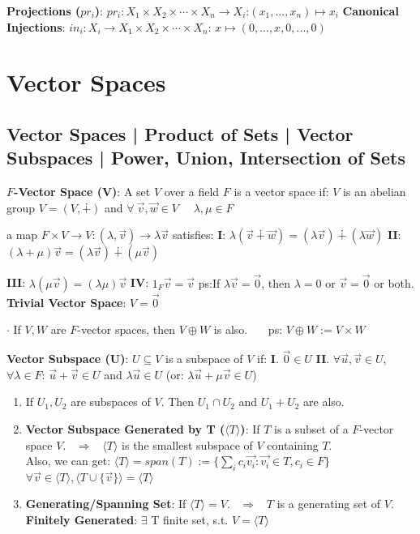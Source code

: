\documentclass[9pt]{article}
\begin{document}
\textbf{Projections ($pr_i$)}: {\small $pr_i:X_1\times X_2\times\cdots\times X_n \to X_i$:$(x_1,...,x_n)\mapsto x_i$} \quad \textbf{Canonical Injections}: {\small $in_i:X_i\to X_1\times X_2\times\cdots\times X_n$: $x\mapsto (0,...,x,0,...,0)$}


\section{Vector Spaces} %

\subsection{Vector Spaces | Product of Sets | Vector Subspaces | Power, Union, Intersection of Sets}

\textbf{$F$-Vector Space (V)}: A set $V$ over a field $F$ is a vector space if: \quad $V$ is an abelian group $V=(V,\dotplus)$ and $\forall \ \vec{v},\vec{w}\in V$ \ \ $\lambda,\mu\in F$

\quad \quad \quad \quad a map $F\times V\to V:(\lambda,\vec{v})\to\lambda\vec{v}$ satisfies: \textbf{I}: $\lambda(\vec{v}\dotplus\vec{w})=(\lambda\vec{v})\dotplus(\lambda\vec{w})$ \quad \textbf{II}: $(\lambda+\mu)\vec{v}=(\lambda\vec{v})\dotplus(\mu\vec{v})$

\quad \quad \quad \quad \textbf{III}: $\lambda(\mu\vec{v})=(\lambda\mu)\vec{v}$ \quad \textbf{IV}: $1_F\vec{v}=\vec{v}$ \hspace{30pt} {\scriptsize ps:If $\lambda\vec{v}=\vec{0}$, then $\lambda=0$ or $\vec{v}=\vec{0}$ or both. \hspace{30pt} \textbf{Trivial Vector Space}: $V=\vec{0}$}

$\cdot$ If $V,W$ are $F$-vector spaces, then $V\oplus W$ is also. \ \ \ ps: $V\oplus W:=V\times W$

\textbf{Vector Subspace (U)}: $U\subseteq V$ is a subspace of $V$ if: \quad \textbf{I}. $\vec{0}\in U$ \quad \textbf{II}. $\forall \vec{u},\vec{v}\in U$, $\forall \lambda\in F$: $\vec{u}+\vec{v}\in U$ and $\lambda\vec{u}\in U$ \quad (or: $\lambda\vec{u}+\mu\vec{v}\in U$)

\begin{enumerate}[itemsep=-2pt, topsep=-2pt]
    \item If $U_1,U_2$ are subspaces of $V$. Then $U_1\cap U_2$ and $U_1+U_2$ are also. 
    \item \textbf{Vector Subspace Generated by T ($\langle T \rangle$)}: {\small If $T$ is a subset of a $F$-vector space $V$. \ $\Rightarrow$ \ $\langle T \rangle$ is the smallest subspace of $V$ containing $T$.} \\
    \quad Also, we can get: $\langle T \rangle=span(T):=\{\sum_ic_i\vec{v_i}: \vec{v_i}\in T,c_i\in F\}$ \quad \quad \quad $\forall \vec{v}\in\langle T \rangle,\langle T \cup\{\vec{v}\}\rangle=\langle T \rangle$
    \item \textbf{Generating/Spanning Set}: If $\langle T \rangle=V$. \ $\Rightarrow$ \ $T$ is a generating set of $V$. \quad \textbf{Finitely Generated}: $\exists$ T finite set, s.t. $V=\langle T\rangle$
\end{enumerate}
\end{document}
